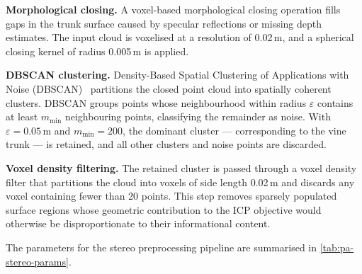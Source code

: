 \textbf{Morphological closing.} A voxel-based morphological closing operation fills gaps in the trunk surface caused by specular reflections or missing depth estimates. The input cloud is voxelised at a resolution of 0.02\,m, and a spherical closing kernel of radius 0.005\,m is applied.

\textbf{DBSCAN clustering.} Density-Based Spatial Clustering of Applications with Noise (DBSCAN)~\cite{esterDensityBasedAlgorithmDiscovering1996}
partitions the closed point cloud into spatially coherent clusters. DBSCAN groups points whose neighbourhood within radius $\varepsilon$ contains at least $m_\mathrm{min}$ neighbouring points, classifying the remainder as noise. With $\varepsilon = 0.05$\,m and $m_\mathrm{min} = 200$,
the dominant cluster --- corresponding to the vine trunk --- is retained, and all other clusters and noise points are discarded.

\textbf{Voxel density filtering.} The retained cluster is passed through a voxel density filter that partitions the cloud into voxels of side length 0.02\,m and discards any voxel containing fewer than 20 points.
This step removes sparsely populated surface regions whose geometric contribution to the ICP objective would otherwise be disproportionate to their informational content.

The parameters for the stereo preprocessing pipeline are summarised in \cref{tab:pa-stereo-params}.

